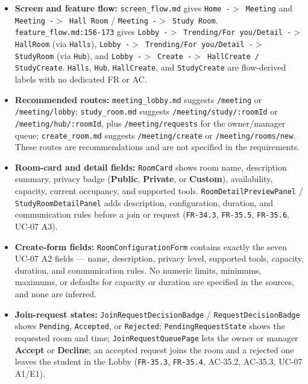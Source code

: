 \documentclass[12pt]{article}
\begin{document}
\begin{itemize}
\item \textbf{Screen and feature flow:} \texttt{screen\_flow.md} gives \texttt{Home -$>$ Meeting} and \texttt{Meeting -$>$ Hall Room} / \texttt{Meeting -$>$ Study Room}. \texttt{feature\_flow.md:156-173} gives \texttt{Lobby -$>$ Trending/For you/Detail -$>$ HallRoom} (via \texttt{Halls}), \texttt{Lobby -$>$ Trending/For you/Detail -$>$ StudyRoom} (via \texttt{Hub}), and \texttt{Lobby -$>$ Create -$>$ HallCreate / StudyCreate}. \texttt{Halls}, \texttt{Hub}, \texttt{HallCreate}, and \texttt{StudyCreate} are flow-derived labels with no dedicated FR or AC.
\item \textbf{Recommended routes:} \texttt{meeting\_lobby.md} suggests \texttt{/meeting} or \texttt{/meeting/lobby}; \texttt{study\_room.md} suggests \texttt{/meeting/study/:roomId} or \texttt{/meeting/hub/:roomId}, plus \texttt{/meeting/requests} for the owner/manager queue; \texttt{create\_room.md} suggests \texttt{/meeting/create} or \texttt{/meeting/rooms/new}. These routes are recommendations and are not specified in the requirements.
\item \textbf{Room-card and detail fields:} \texttt{RoomCard} shows room name, description summary, privacy badge (\textbf{Public}, \textbf{Private}, or \textbf{Custom}), availability, capacity, current occupancy, and supported tools. \texttt{RoomDetailPreviewPanel} / \texttt{StudyRoomDetailPanel} adds description, configuration, duration, and communication rules before a join or request (\texttt{FR-34.3}, \texttt{FR-35.5}, \texttt{FR-35.6}, UC-07 A3).
\item \textbf{Create-form fields:} \texttt{RoomConfigurationForm} contains exactly the seven UC-07 A2 fields --- name, description, privacy level, supported tools, capacity, duration, and communication rules. No numeric limits, minimums, maximums, or defaults for capacity or duration are specified in the sources, and none are inferred.
\item \textbf{Join-request states:} \texttt{JoinRequestDecisionBadge} / \texttt{RequestDecisionBadge} shows \texttt{Pending}, \texttt{Accepted}, or \texttt{Rejected}; \texttt{PendingRequestState} shows the requested room and time; \texttt{JoinRequestQueuePage} lets the owner or manager \textbf{Accept} or \textbf{Decline}; an accepted request joins the room and a rejected one leaves the student in the Lobby (\texttt{FR-35.3}, \texttt{FR-35.4}, AC-35.2, AC-35.3, UC-07 A1/E1).

\end{itemize}
\end{document}
